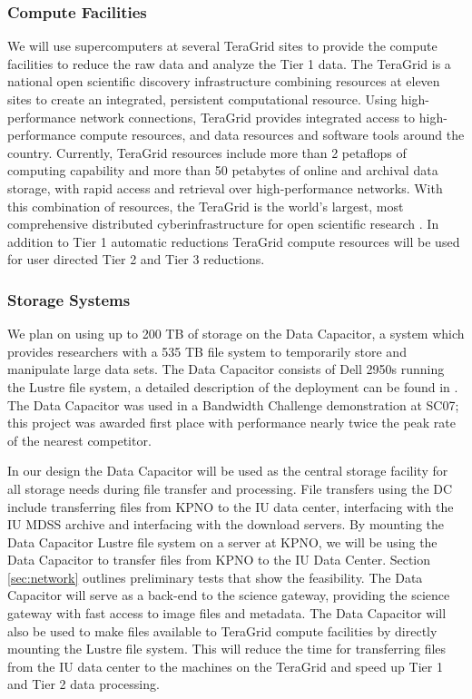 \documentclass[10pt,conference]{IEEEtran}
\begin{document}
\subsubsection{Compute Facilities}

We will use supercomputers at several TeraGrid sites to provide the compute facilities to reduce the raw data and analyze the Tier 1 data. The TeraGrid is a national open scientific discovery infrastructure combining resources at eleven sites to create an integrated, persistent computational resource. Using high-performance network connections, TeraGrid provides integrated access to high-performance compute resources, and data resources and software tools around the country. Currently, TeraGrid resources include more than 2 petaflops of computing capability and more than 50 petabytes of online and archival data storage, with rapid access and retrieval over high-performance networks. With this combination of resources, the TeraGrid is the world's largest, most comprehensive distributed cyberinfrastructure for open scientific research \cite{teragrid}. In addition to Tier 1 automatic reductions TeraGrid compute resources will be used for user directed Tier 2 and Tier 3 reductions.

\subsubsection{Storage Systems}

We plan on using up to 200 TB of storage on the Data Capacitor, a system which provides researchers with a 535 TB file system to temporarily store and manipulate large data sets. The Data Capacitor consists of Dell 2950s running the Lustre file system, a detailed description of the deployment can be found in \cite{simms2007}. The Data Capacitor was used in a Bandwidth Challenge demonstration at SC07; this project was awarded first place with performance nearly twice the peak rate of the nearest competitor.

In our design the Data Capacitor will be used as the central storage facility for all storage needs during file transfer and processing. File transfers using the DC include transferring files from KPNO to the IU data center, interfacing with the IU MDSS archive and interfacing with the download servers. By mounting the Data Capacitor Lustre file system on a server at KPNO, we will be using the Data Capacitor to transfer files from KPNO to the IU Data Center. Section \ref{sec:network} outlines preliminary tests that show the feasibility. The Data Capacitor will serve as a back-end to the science gateway, providing the science gateway with fast access to image files and metadata. The Data Capacitor will also be used to make files available to TeraGrid compute facilities by directly mounting the Lustre file system. This will reduce the time for transferring files from the IU data center to the machines on the TeraGrid and speed up Tier 1 and Tier 2 data processing.
\end{document}
